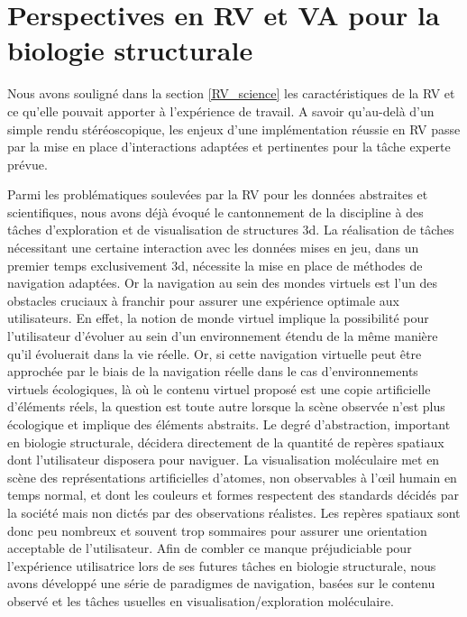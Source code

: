 \section{Perspectives en RV et VA pour la biologie structurale} %
\label{sec:perspectives}

Nous avons souligné dans la section \ref{RV_science} les caractéristiques de la RV et ce qu'elle pouvait apporter à l'expérience de travail. A savoir qu'au-delà d'un simple rendu stéréoscopique, les enjeux d'une implémentation réussie en RV passe par la mise en place d'interactions adaptées et pertinentes pour la tâche experte prévue.

Parmi les problématiques soulevées par la RV pour les données abstraites et scientifiques, nous avons déjà évoqué le cantonnement de la discipline à des tâches d'exploration et de visualisation de structures 3d. La réalisation de tâches nécessitant une certaine interaction avec les données mises en jeu, dans un premier temps exclusivement 3d, nécessite la mise en place de méthodes de navigation adaptées. Or la navigation au sein des mondes virtuels est l'un des obstacles cruciaux à franchir pour assurer une expérience optimale aux utilisateurs. En effet, la notion de monde virtuel implique la possibilité pour l'utilisateur d'évoluer au sein d'un environnement étendu de la même manière qu'il évoluerait dans la vie réelle. Or, si cette navigation virtuelle peut être approchée par le biais de la navigation réelle dans le cas d'environnements virtuels écologiques, là où le contenu virtuel proposé est une copie artificielle d'éléments réels, la question est toute autre lorsque la scène observée n'est plus écologique et implique des éléments abstraits. Le degré d'abstraction, important en biologie structurale, décidera directement de la quantité de repères spatiaux dont l'utilisateur disposera pour naviguer. La visualisation moléculaire met en scène des représentations artificielles d'atomes, non observables à l’œil humain en temps normal, et dont les couleurs et formes respectent des standards décidés par la société mais non dictés par des observations réalistes. Les repères spatiaux sont donc peu nombreux et souvent trop sommaires pour assurer une orientation acceptable de l'utilisateur. Afin de combler ce manque préjudiciable pour l'expérience utilisatrice lors de ses futures tâches en biologie structurale, nous avons développé une série de paradigmes de navigation, basées sur le contenu observé et les tâches usuelles en visualisation/exploration moléculaire.

